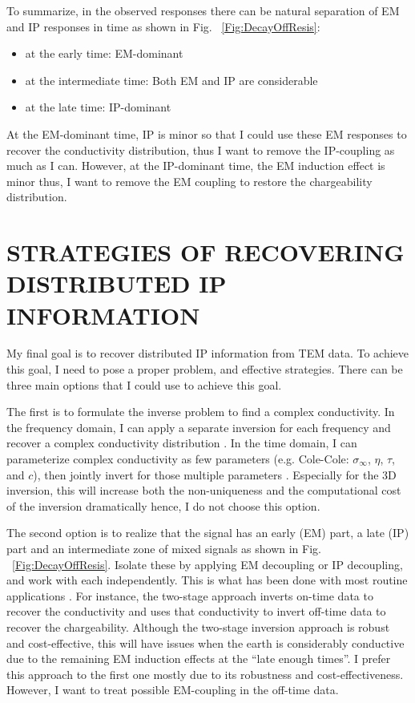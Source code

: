 \documentclass[letterpaper,11pt]{article}
\newcommand{\siginf}{\sigma_\infty}
\begin{document}
To summarize, in the observed responses there can be natural separation of EM and IP responses in time as shown in Fig. ~\ref{Fig:DecayOffResis}:
\begin{itemize}
  \item at the early time: EM-dominant
  \item at the intermediate time: Both EM and IP are considerable
  \item at the late time: IP-dominant
\end{itemize}
At the EM-dominant time, IP is minor so that I could use these EM responses to recover the conductivity distribution, thus I want to remove the IP-coupling as much as I can. However, at the IP-dominant time, the EM induction effect is minor thus, I want to remove the EM coupling to restore the chargeability distribution.  
\clearpage

\section{STRATEGIES OF RECOVERING DISTRIBUTED IP INFORMATION}
My final goal is to recover distributed IP information from TEM data. To achieve this goal, I need to pose a proper problem, and effective strategies. There can be three main options that I could use to achieve this goal. 

The first is to formulate the inverse problem to find a complex conductivity. In the frequency domain, I can apply a separate inversion for each frequency and recover a complex conductivity distribution \cite[]{Kemna2004,commer2011}. In the time domain, I can parameterize complex conductivity as few parameters (e.g. Cole-Cole: $\siginf$, $\eta$, $\tau$, and $c$), then jointly invert for those multiple parameters \cite[]{Fiandaca2012,Marchant2013,Xu2013}. Especially for the 3D inversion, this will increase both the non-uniqueness and the computational cost of the inversion dramatically hence, I do not choose this option. 

The second option is to realize that the signal has an early (EM) part, a late (IP) part and an intermediate zone of mixed signals as shown in Fig. ~\ref{Fig:DecayOffResis}. Isolate these by applying EM decoupling or IP decoupling, and work with each independently. This is what has been done with most routine applications \cite[]{doug1994}. For instance, the two-stage approach inverts on-time data to recover the conductivity and uses that conductivity to invert off-time data to recover the chargeability. Although the two-stage inversion approach is robust and cost-effective, this will have issues when the earth is considerably conductive due to the remaining EM induction effects at the ``late enough times''. 
I prefer this approach to the first one mostly due to its robustness and cost-effectiveness. However, I want to treat possible EM-coupling in the off-time data. 
\end{document}

